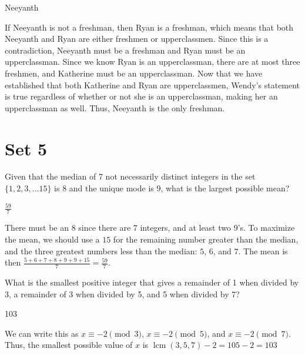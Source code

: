 \documentclass[11pt]{article}
\DeclareMathOperator{\lcm}{lcm}
\begin{document}
\begin{answer}
Neeyanth
\end{answer}

\begin{solution}
If Neeyanth is not a freshman, then Ryan is a freshman, which means that both Neeyanth and Ryan are either freshmen or upperclassmen. Since this is a contradiction, Neeyanth must be a freshman and Ryan must be an upperclassman. Since we know Ryan is an upperclassman, there are at most three freshmen, and Katherine must be an upperclassman. Now that we have established that both Katherine and Ryan are upperclassmen, Wendy's statement is true regardless of whether or not she is an upperclassman, making her an upperclassman as well. Thus, Neeyanth is the only freshman.
\end{solution}

\newpage
\section*{Set 5}
\begin{problem}
Given that the median of 7 not necessarily distinct integers in the set $\{1, 2, 3, \dots 15\}$ is 8 and the unique mode is 9, what is the largest possible mean?
\end{problem}

\begin{answer}
$\frac{59}{7}$
\end{answer}

\begin{solution}
There must be an 8 since there are 7 integers, and at least two 9's. To maximize the mean, we should use a $15$ for the remaining
number greater than the median, and the three greatest numbers less than the median: $5$, $6$, and $7$. The mean is then
$\frac{5+6+7+8+9+9+15}{7} = \boxed{\frac{59}{7}}$.
\end{solution}

\begin{problem}
What is the smallest positive integer that gives a remainder of 1 when divided by 3, a remainder of 3 when divided by 5, and 5 when divided by 7?
\end{problem}

\begin{answer}
103
\end{answer}

\begin{solution}
We can write this as $x \equiv -2 \pmod{3}$, $x \equiv -2 \pmod{5}$, and $x \equiv -2 \pmod{7}$. 
Thus, the smallest possible value of $x$ is $\lcm (3, 5, 7) - 2 = 105-2 = \boxed{103}$
\end{solution}
\end{document}
